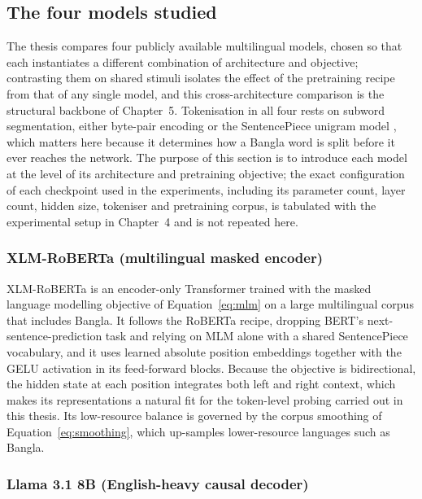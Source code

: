 \subsection{The four models studied}
\label{sec:four-models}

The thesis compares four publicly available multilingual models, chosen so that each instantiates a different combination of architecture and objective; contrasting them on shared stimuli isolates the effect of the pretraining recipe from that of any single model, and this cross-architecture comparison is the structural backbone of Chapter~5. Tokenisation in all four rests on subword segmentation, either byte-pair encoding \cite{sennrich2016bpe} or the SentencePiece unigram model \cite{kudo2018sentencepiece}, which matters here because it determines how a Bangla word is split before it ever reaches the network. The purpose of this section is to introduce each model at the level of its architecture and pretraining objective; the exact configuration of each checkpoint used in the experiments, including its parameter count, layer count, hidden size, tokeniser and pretraining corpus, is tabulated with the experimental setup in Chapter~4 and is not repeated here.

\subsubsection{XLM-RoBERTa (multilingual masked encoder)}

XLM-RoBERTa \cite{conneau2020xlmr} is an encoder-only Transformer trained with the masked language modelling objective of Equation~\eqref{eq:mlm} on a large multilingual corpus that includes Bangla. It follows the RoBERTa recipe, dropping BERT's next-sentence-prediction task and relying on MLM alone with a shared SentencePiece vocabulary, and it uses learned absolute position embeddings together with the GELU activation \cite{hendrycks2016gelu} in its feed-forward blocks. Because the objective is bidirectional, the hidden state at each position integrates both left and right context, which makes its representations a natural fit for the token-level probing carried out in this thesis. Its low-resource balance is governed by the corpus smoothing of Equation~\eqref{eq:smoothing}, which up-samples lower-resource languages such as Bangla.

\subsubsection{Llama 3.1 8B (English-heavy causal decoder)}

